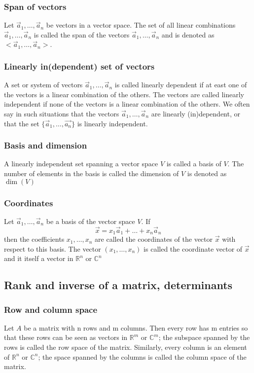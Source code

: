 \documentclass{article}
\begin{document}
			\subsubsection{Span of vectors}
			Let $\vec{a}_1,\dots,\vec{a}_n$ be vectors in a vector space. The set of all linear combinations $\vec{a}_1,\dots,\vec{a}_n$ is called the span of the vectors $\vec{a}_1,\dots,\vec{a}_n$ and is denoted as $<\vec{a}_1,\dots,\vec{a}_n>$.
			
			\subsubsection{Linearly in(dependent) set of vectors}
			A set or system of vectors $\vec{a}_1,\dots,\vec{a}_n$ is called linearly dependent if at east one of the vectors is a linear combination of the others. The vectors are called linearly independent if none of the vectors is a linear combination of the others. We often say in such situations that the vectors $\vec{a}_1,\dots,\vec{a}_n$ are linearly (in)dependent, or that the set $\{\vec{a}_1,\dots,\vec{a_n}\}$ is linearly independent.
			
			\subsubsection{Basis and dimension}
			A linearly independent set spanning a vector space $V$ is called a basis of $V$. The number of elements in the basis is called the dimension of $V$ is denoted as $\dim(V)$
			
			\subsubsection{Coordinates}
			Let $\vec{a}_1,\dots,\vec{a}_n$ be a basis of the vector space $V$. If 
			\begin{equation*}
				\vec{x} = x_1\vec{a}_1 + \dots + x_n\vec{a}_n
			\end{equation*}
			then the coefficients $x_1,\dots,x_n$ are called the coordinates of the vector $\vec{x}$ with respect to this basis. The vector $(x_1,\dots,x_n)$ is called the coordinate vector of $\vec{x}$ and it itself a vector in $\mathbb{R}^n$ or $\mathbb{C}^n$
			
		\subsection{Rank and inverse of a matrix, determinants}
			\subsubsection{Row and column space}
			Let $A$ be a matrix with n rows and m columns. Then every row has m entries so that these rows can be seen as vectors in $\mathbb{R}^m$ or $\mathbb{C}^m$; the subspace spanned by the rows is called the row space of the matrix. Similarly, every column is an element of $\mathbb{R}^n$ or $\mathbb{C}^n$; the space spanned by the columns is called the column space of the matrix.
			
\end{document}
